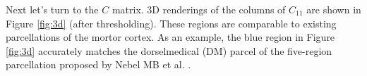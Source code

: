 \documentclass[fleqn,12pt]{article}
\let\oldref\ref
\renewcommand{\ref}[1]{(\oldref{#1})}
\begin{document}
Next let's turn to the $C$ matrix. 3D renderings of the columns of $C_{11}$ are shown in Figure \oldref{fig:3d} (after thresholding). These regions are comparable to existing parcellations of the mortor cortex. As an example, the blue region in Figure \oldref{fig:3d} accurately matches the dorselmedical (DM) parcel of the five-region parcellation proposed by Nebel MB et al. \citep{nebel2014disruption}.
\
\end{document}
